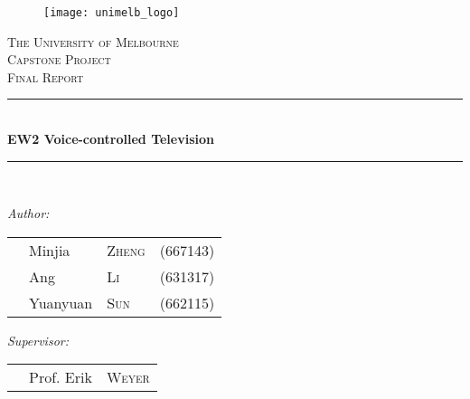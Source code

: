 \begin{titlepage}

\newcommand{\HRule}{\rule{\linewidth}{0.5mm}} %

\center %
 

\begin{figure}[H]
\centering
\texttt{[image: unimelb\_logo]}
\end{figure}
\textsc{\LARGE The University of Melbourne}\\[1.5cm] %
\textsc{\Large Capstone Project}\\[0.5cm] %
\textsc{\large Final Report}\\[0.5cm] %


\HRule \\[0.8cm]
{\LARGE \bfseries EW2 Voice-controlled Television}\\[0.4cm] %
\HRule \\[1.5cm]


\begin{flushleft} \large
\emph{Author:}\\
\begin{tabular}{llll}
&Minjia		&\textsc{Zheng}	&(667143)\\
&Ang		&\textsc{Li}	&(631317)\\
&Yuanyuan	&\textsc{Sun}	&(662115)
\end{tabular}
\end{flushleft}

\begin{flushleft} \large
\emph{Supervisor:} \\
\begin{tabular}{lll}
&Prof. Erik &\textsc{Weyer}
\end{tabular}
\end{flushleft}


\end{titlepage}
